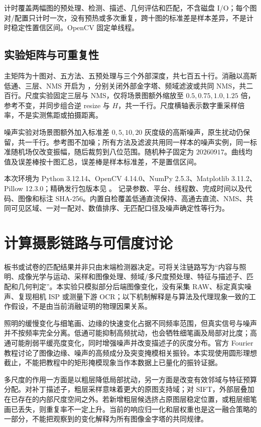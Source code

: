 计时覆盖两幅图的预处理、检测、描述、几何评估和匹配，不含磁盘 I/O；每个图对/配置只计时一次，没有预热或多次重复，跨十图的标准差是样本差异，不是计时稳定性置信区间。OpenCV 固定单线程。

\subsection{实验矩阵与可重复性}
主矩阵为十图对、五方法、五预处理与三个外部深度，共七百五十行。消融以高斯低通、三层、NMS 开启为 ，分别关闭外部金字塔、频域滤波或共同 NMS，共二百行。尺度实验固定三层与 NMS，仅将场景图额外缩放至 $0.5,0.75,1.0,1.25$ 倍，参考不变，并同步组合逆 resize 与 $H$，共一千行。尺度横轴表示数字重采样倍率，不是实测焦距或拍摄距离。

噪声实验对场景图额外加入标准差 $0,5,10,20$ 灰度级的高斯噪声，原生扰动仍保留，共一千行。参考图不加噪；所有方法及滤波共用同一样本的噪声实例，同一标准随机场仅改变振幅，随后裁剪到八位范围。随机种子固定为 $20260917$。曲线均值及误差棒按十图汇总，误差棒是样本标准差，不是置信区间。

本次环境为 Python 3.12.14、OpenCV 4.14.0、NumPy 2.5.3、Matplotlib 3.11.2、Pillow 12.3.0；精确发行包版本见 。 记录参数、平台、线程数、完成时间以及代码、图像和标注 SHA-256。内置自检覆盖低通直流保持、高通去直流、NMS、共同可见区域、一对一配对、数值排序、无匹配口径及噪声确定性等行为。

\clearpage


\clearpage
\section{计算摄影链路与可信度讨论}
板书或试卷的匹配结果并非只由末端检测器决定。可将关注链路写为“内容与照明、成像光学与运动、采样和图像处理、频域/多尺度预处理、特征与描述子、匹配和几何判定”。本实验只模拟部分后端图像变化，没有采集 RAW、标定真实噪声、复现相机 ISP 或测量下游 OCR；以下机制解释是与算法及代理现象一致的工作假设，不是由当前消融证明的物理因果关系。

照明的缓慢变化与细笔画、边缘的快速变化占据不同频率范围，但真实信号与噪声并不按频率完全分离。低通可能抑制高频扰动，也会牺牲细笔画及局部对比度；高通可能削弱平缓亮度变化，同时增强噪声并改变描述子的灰度分布。官方 Fourier 教程讨论了图像边缘、噪声的高频成分及突变掩模相关振铃\cite{fourier}。本实现使用圆形理想截止，不能把教程中的矩形掩模现象当作本数据上已量化的振铃证据。

多尺度的作用一方面是以粗层降低局部扰动，另一方面是改变有效邻域与特征预算分配。对补丁描述子，粗层采样意味着更大的原图支持域；对 SIFT，外部层叠加在已存在的内部尺度空间之外。若新增粗层候选挤占原图层稳定位置，或粗层细笔画已丢失，则重复率不一定上升。当前的响应归一化和层权重也是这一融合策略的一部分，不能把观察到的变化解释为所有图像金字塔的共同规律。

